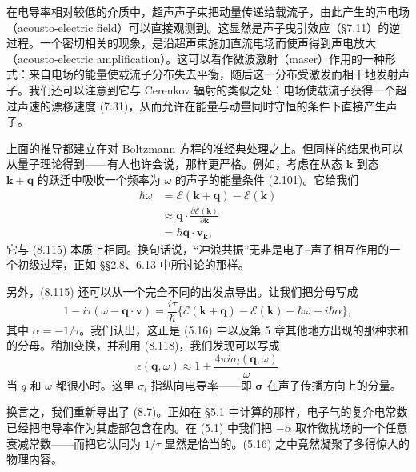 在电导率相对较低的介质中，超声声子束把动量传递给载流子，由此产生的声电场（acousto-electric field）可以直接观测到。这显然是声子曳引效应（§7.11）的逆过程。一个密切相关的现象，是沿超声束施加直流电场而使声得到声电放大（acousto-electric amplification）。这可以看作微波激射（maser）作用的一种形式：来自电场的能量使载流子分布失去平衡，随后这一分布受激发而相干地发射声子。我们还可以注意到它与 Cerenkov 辐射的类似之处：电场使载流子获得一个超过声速的漂移速度 (7.31)，从而允许在能量与动量同时守恒的条件下直接产生声子。

上面的推导都建立在对 Boltzmann 方程的准经典处理之上。但同样的结果也可以从量子理论得到——有人也许会说，那样更严格。例如，考虑在从态 $\mathbf{k}$ 到态 $\mathbf{k}+\mathbf{q}$ 的跃迁中吸收一个频率为 $\omega$ 的声子的能量条件 (2.101)。它给我们
\begin{align*}
\hbar\omega &= \mathcal{E}(\mathbf{k}+\mathbf{q}) - \mathcal{E}(\mathbf{k}) \\
&\approx \mathbf{q}\cdot\frac{\partial\mathcal{E}(\mathbf{k})}{\partial\mathbf{k}} \\
&= \hbar\mathbf{q}\cdot\mathbf{v}_{\mathbf{k}}, \tag{8.118}
\end{align*}
它与 (8.115) 本质上相同。换句话说，“冲浪共振”无非是电子–声子相互作用的一个初级过程，正如 §§2.8、6.13 中所讨论的那样。

另外，(8.115) 还可以从一个完全不同的出发点导出。让我们把分母写成
\begin{equation*}
1-i\tau(\omega-\mathbf{q}\cdot\mathbf{v}) = \frac{i\tau}{\hbar}\bigl\{\mathcal{E}(\mathbf{k}+\mathbf{q}) - \mathcal{E}(\mathbf{k}) - \hbar\omega - i\hbar\alpha\bigr\}, \tag{8.119}
\end{equation*}
其中 $\alpha=-1/\tau$。我们认出，这正是 (5.16) 中以及第 5 章其他地方出现的那种求和的分母。稍加变换，并利用 (8.118)，我们发现可以写成
\begin{equation*}
\epsilon(\mathbf{q},\omega) \approx 1 + \frac{4\pi i\sigma_l(\mathbf{q},\omega)}{\omega} \tag{8.120}
\end{equation*}
当 $q$ 和 $\omega$ 都很小时。这里 $\sigma_l$ 指纵向电导率——即 $\boldsymbol{\sigma}$ 在声子传播方向上的分量。

换言之，我们重新导出了 (8.7)。正如在 §5.1 中计算的那样，电子气的复介电常数已经把电导率作为其虚部包含在内。在 (5.1) 中我们把 $-\alpha$ 取作微扰场的一个任意衰减常数——而把它认同为 $1/\tau$ 显然是恰当的。(5.16) 之中竟然凝聚了多得惊人的物理内容。
